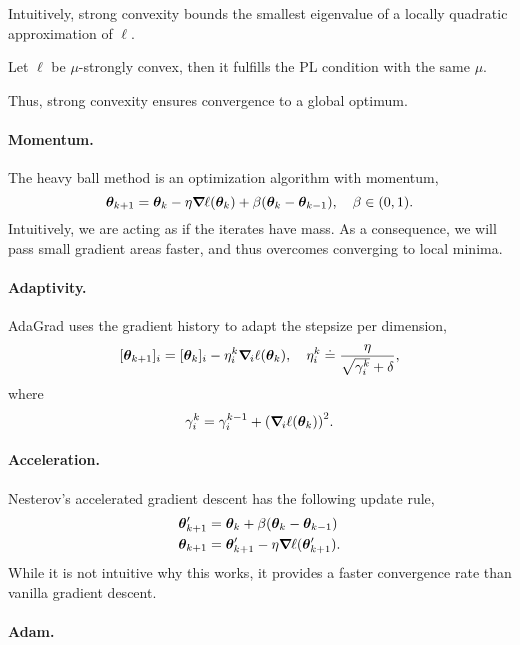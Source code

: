 Intuitively, strong convexity bounds the smallest eigenvalue of a locally quadratic approximation
of $\ell$.

\begin{lemma}
    Let $\ell$ be $\mu$-strongly convex, then it fulfills the PL condition with the same $\mu$.
\end{lemma}

Thus, strong convexity ensures convergence to a global optimum.

\paragraph{Momentum.}

The heavy ball method is an optimization algorithm with momentum, \[
    \vec{\theta}_{k+1} = \vec{\theta}_k - \eta \grad{\ell(\vec{\theta}_k)}{} + \beta (\vec{\theta}_k - \vec{\theta}_{k-1}), \quad \beta \in (0,1).
\]
Intuitively, we are acting as if the iterates have mass. As a consequence, we will pass small
gradient areas faster, and thus overcomes converging to local minima.

\paragraph{Adaptivity.}

AdaGrad uses the gradient history to adapt the stepsize per dimension, \[
    [\vec{\theta}_{k+1}]_i = [\vec{\theta}_k]_i - \eta_i^k \grad{\ell(\vec{\theta}_k)}{i}, \quad \eta_i^k \doteq \frac{\eta}{\sqrt{\gamma_i^k} + \delta},
\]
where \[
    \gamma_i^k = \gamma_i^{k-1} + \lft( \grad{\ell(\vec{\theta}_k)}{i} \rgt)^2.
\]

\paragraph{Acceleration.}

Nesterov's accelerated gradient descent has the following update rule,
\begin{align*}
    \vec{\theta}_{k+1}' & = \vec{\theta}_k + \beta (\vec{\theta}_k - \vec{\theta}_{k-1})   \\
    \vec{\theta}_{k+1}  & = \vec{\theta}_{k+1}' - \eta \grad{\ell(\vec{\theta}_{k+1}')}{}.
\end{align*}
While it is not intuitive why this works, it provides a faster convergence rate than vanilla gradient
descent.

\paragraph{Adam.}

